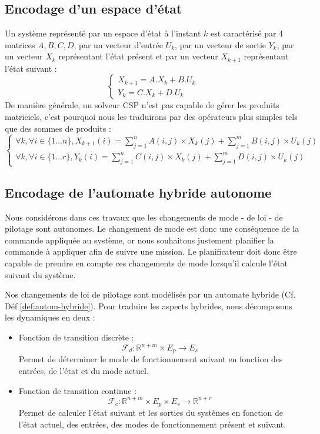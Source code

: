 \subsection{Encodage d'un espace d'état}
Un système représenté par un espace d'état à l'instant $k$ est caractérisé par 4 matrices $A, B, C, D$, par un vecteur d'entrée $U_k$, par un vecteur de sortie $Y_k$, par un vecteur $X_k$ représentant l'état présent et par un vecteur $X_{k+1}$ représentant l'état suivant :
\begin{equation}
   \left \{
\begin{array}{l}
X_{k+1} = A.X_k + B.U_k \\
Y_k = C.X_k + D.U_k
\end{array}
\right. 
\label{eq:espaceEtat}
\end{equation}
De manière générale, un solveur CSP n'est pas capable de gérer les produits matriciels, c'est pourquoi nous les traduirons par des opérateurs plus simples tels que des sommes de produits : 
\begin{equation}
\left \{
\begin{array}{l}
\forall k, \forall i \in \{1 \ldots n\}, X_{k+1}(i) = \sum_{j=1}^{n} A(i,j)\times X_k(j) + \sum_{j=1}^{m} B(i,j)\times U_k(j) \\
\forall k, \forall i \in \{1 \ldots r\}, Y_k(i) = \sum_{j=1}^{n} C(i,j)\times X_k(j) + \sum_{j=1}^{m} D(i,j)\times U_k(j)
\end{array}
\right. 
\label{eq:espaceEtatExplose}
\end{equation}

\subsection{Encodage de l'automate hybride autonome}
Nous considérons dans ces travaux que les changements de mode - de loi - de pilotage sont autonomes. Le changement de mode est donc une conséquence de la commande appliquée au système, or nous souhaitons justement planifier la commande à appliquer afin de suivre une mission. Le planificateur doit donc être capable de prendre en compte ces changements de mode lorsqu'il calcule l'état suivant du système.

Nos changements de loi de pilotage sont modélisés par un automate hybride (Cf. Déf \ref{def:autom-hybride}). Pour traduire les aspects hybrides, nous décomposons les dynamiques en deux : 
\begin{itemize}
	\item Fonction de transition discrète :
	\[\mathcal{F}_d : \mathbb{R}^{n+m}\times \mathit{E}_p \rightarrow \mathit{E}_s\]
	Permet de déterminer le mode de fonctionnement suivant en fonction des entrées, de l'état et du mode actuel.
	\item Fonction de transition continue : 
	\[\mathcal{F}_c : \mathbb{R}^{n+m}\times \mathit{E}_p \times \mathit{E}_s \rightarrow \mathbb{R}^{n+r}\]
	Permet de calculer l'état suivant et les sorties du systèmes en fonction de l'état actuel, des entrées, des modes de fonctionnement présent et suivant.
\end{itemize}

